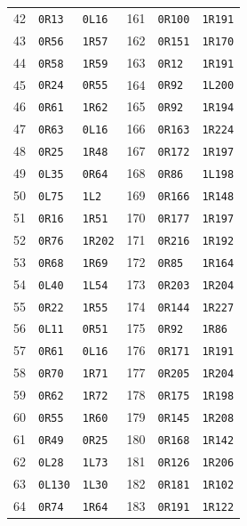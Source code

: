\begin{longtable}{rll@{\qquad}rll}
42 & \texttt{0R13} & \texttt{0L16} & 161 & \texttt{0R100} & \texttt{1R191}\\
43 & \texttt{0R56} & \texttt{1R57} & 162 & \texttt{0R151} & \texttt{1R170}\\
44 & \texttt{0R58} & \texttt{1R59} & 163 & \texttt{0R12} & \texttt{1R191}\\
45 & \texttt{0R24} & \texttt{0R55} & 164 & \texttt{0R92} & \texttt{1L200}\\
46 & \texttt{0R61} & \texttt{1R62} & 165 & \texttt{0R92} & \texttt{1R194}\\
47 & \texttt{0R63} & \texttt{0L16} & 166 & \texttt{0R163} & \texttt{1R224}\\
48 & \texttt{0R25} & \texttt{1R48} & 167 & \texttt{0R172} & \texttt{1R197}\\
49 & \texttt{0L35} & \texttt{0R64} & 168 & \texttt{0R86} & \texttt{1L198}\\
50 & \texttt{0L75} & \texttt{1L2} & 169 & \texttt{0R166} & \texttt{1R148}\\
51 & \texttt{0R16} & \texttt{1R51} & 170 & \texttt{0R177} & \texttt{1R197}\\
52 & \texttt{0R76} & \texttt{1R202} & 171 & \texttt{0R216} & \texttt{1R192}\\
53 & \texttt{0R68} & \texttt{1R69} & 172 & \texttt{0R85} & \texttt{1R164}\\
54 & \texttt{0L40} & \texttt{1L54} & 173 & \texttt{0R203} & \texttt{1R204}\\
55 & \texttt{0R22} & \texttt{1R55} & 174 & \texttt{0R144} & \texttt{1R227}\\
56 & \texttt{0L11} & \texttt{0R51} & 175 & \texttt{0R92} & \texttt{1R86}\\
57 & \texttt{0R61} & \texttt{0L16} & 176 & \texttt{0R171} & \texttt{1R191}\\
58 & \texttt{0R70} & \texttt{1R71} & 177 & \texttt{0R205} & \texttt{1R204}\\
59 & \texttt{0R62} & \texttt{1R72} & 178 & \texttt{0R175} & \texttt{1R198}\\
60 & \texttt{0R55} & \texttt{1R60} & 179 & \texttt{0R145} & \texttt{1R208}\\
61 & \texttt{0R49} & \texttt{0R25} & 180 & \texttt{0R168} & \texttt{1R142}\\
62 & \texttt{0L28} & \texttt{1L73} & 181 & \texttt{0R126} & \texttt{1R206}\\
63 & \texttt{0L130} & \texttt{1L30} & 182 & \texttt{0R181} & \texttt{1R102}\\
64 & \texttt{0R74} & \texttt{1R64} & 183 & \texttt{0R191} & \texttt{1R122}\\

\end{longtable}
